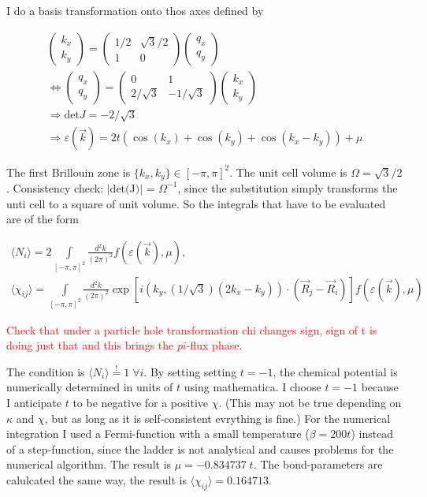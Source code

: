 \documentclass[../../../maim.tex]{subfiles}
\begin{document}
I do a basis transformation onto thos axes defined by 

\begin{gather}
	\begin{pmatrix}
		k_x \\
		k_y
	\end{pmatrix} =
	\begin{pmatrix}
		1/2 & \sqrt{3}/2 \\
		1 & 0 
	\end{pmatrix}
	\begin{pmatrix}
		q_x \\
		q_y
	\end{pmatrix} \\
	\Leftrightarrow 
	\begin{pmatrix}
		q_x \\
		q_y
	\end{pmatrix}=
	\begin{pmatrix}
		0 & 1 \\
		2/\sqrt{3} & -1/\sqrt{3} 
	\end{pmatrix}
	\begin{pmatrix}
		k_x \\
		k_y
	\end{pmatrix}\\
	\Rightarrow \text{det$J$} = -2/\sqrt{3} \\
	\Rightarrow \varepsilon(\vec{k}) = 2t\left(\cos(k_x) + \cos(k_y) + \cos(k_x -k_y)\right) + \mu
\end{gather}

The first Brillouin zone is $\{k_x, k_y\} \in [-\pi,\pi]^2$. The unit cell volume is $\Omega = \sqrt{3}/2$. Consistency check: $|\text{det}($J$)|$ = $\Omega^{-1}$, since the substitution simply transforms the unti cell to a square of unit volume. So the integrals that have to be evaluated are of the form

\begin{gather}
	\langle N_i \rangle = 2\int\limits_{[-\pi,\pi]^2} \frac{d^2k}{(2\pi)^2} f(\varepsilon(\vec{k}), \mu), \\
	\langle \chi_{ij} \rangle = \int\limits_{[-\pi,\pi]^2} \frac{d^2k}{(2\pi)^2} \exp[i\left(k_y, (1/\sqrt{3})(2k_x-k_y)\right)\cdot(\vec{R}_j-\vec{R}_i)] f(\varepsilon(\vec{k}), \mu)
\end{gather}

\textcolor{red}{Check that under a particle hole transformation chi changes sign, sign of t is doing just that and this brings the $pi$-flux phase.}

The condition is $\langle N_i \rangle \overset{!}{=} 1 \; \forall i$. By setting setting $t = -1$, the chemical potential is numerically determined in units of $t$ using mathematica. I choose $t=-1$ because I anticipate $t$ to be negative for a positive $\chi$. (This may not be true depending on $\kappa$ and $\chi$, but as long as it is self-consistent evrything is fine.) For the numerical integration I used a Fermi-function with a small temperature ($\beta = 200t$) instead of a step-function, since the ladder is not analytical and causes problems for the numerical algorithm. The result is $\mu = -0.834737 \; t$. The bond-parameters are calulcated the same way, the result is $\langle \chi_{ij} \rangle = 0.164713$. \\
\end{document}
